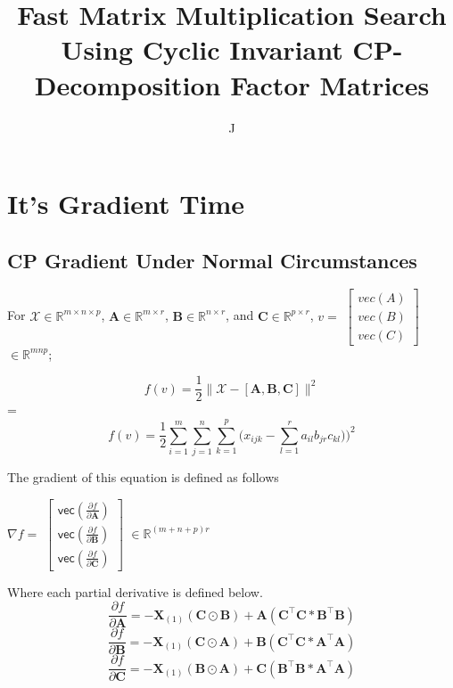 \documentclass{article}
\title{Fast Matrix Multiplication Search Using Cyclic Invariant CP-Decomposition Factor Matrices}
\author{J}
\date{}
\begin{document}
\maketitle


\section{It's Gradient Time}
\subsection{CP Gradient Under Normal Circumstances}
For $\mathcal{X} \in \mathbb{R}^{m\times n\times p}$, $\mathbf{A} \in \mathbb{R}^{m\times r}$, $\mathbf{B} \in \mathbb{R}^{n\times r}$, and $\mathbf{C} \in \mathbb{R}^{p\times r}$, $v =$
$\begin{bmatrix}
    vec(A)\\
    vec(B)\\
    vec(C)
\end{bmatrix}$
$\in \mathbb{R}^{mnp}$;
\begin{center}
    \begin{equation}
    f(v) = \frac{1}{2}\|\mathcal{X} - [\mathbf{A, B, C}]\|^2
    \end{equation}
    =
    \begin{equation}
    f(v) = \frac{1}{2}\sum_{i=1}^m\sum_{j=1}^n\sum_{k=1}^p\bigl(x_{ijk}-\sum_{l=1}^{r}a_{il}b_{jr}c_{kl})\bigl)^2
    \end{equation}
\end{center}

The gradient of this equation is defined as follows
\begin{center}
    $\nabla f =$
    $\begin{bmatrix}
        \mathsf{vec}(\frac{\partial f}{\partial \mathbf{A}})\\
        \mathsf{vec}(\frac{\partial f}{\partial \mathbf{B}})\\
        \mathsf{vec}(\frac{\partial f}{\partial \mathbf{C}})
    \end{bmatrix}$
    $\in \mathbb{R}^{(m+n+p)r}$
\end{center}

Where each partial derivative is defined below. 
\begin{equation}
    \frac{\partial f}{\partial \mathbf{A}} = -\mathbf{X}_{(1)}(\mathbf{C\odot B}) + \mathbf{A(C^\intercal C\ast B^\intercal B)}
\end{equation}
\begin{equation}
    \frac{\partial f}{\partial \mathbf{B}} = -\mathbf{X}_{(1)}(\mathbf{C\odot A}) + \mathbf{B(C^\intercal C\ast A^\intercal A)}
\end{equation}
\begin{equation}
    \frac{\partial f}{\partial \mathbf{C}} = -\mathbf{X}_{(1)}(\mathbf{B\odot A}) + \mathbf{C(B^\intercal B\ast A^\intercal A)}
\end{equation}
\end{document}
